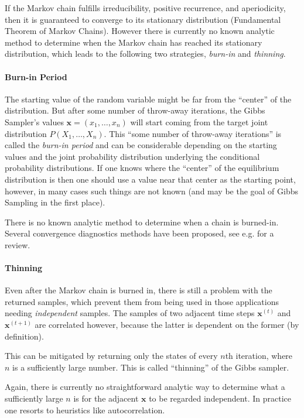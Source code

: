 If the Markov chain fulfills irreducibility, positive recurrence,
and aperiodicity, then it is guaranteed to converge to its stationary
distribution (Fundamental Theorem of Markov Chains). However there
is currently no known analytic method to determine when the Markov
chain has reached its stationary distribution, which leads to the
following two strategies, \emph{burn-in} and \emph{thinning}.

\paragraph{Burn-in Period}

The starting value of the random variable might be far from the ``center''
of the distribution. But after some number of throw-away iterations,
the Gibbs Sampler's values $\mathbf{x}=(x_{1},\dots,x_{n})$ will
start coming from the target joint distribution $P(X_{1},\dots,X_{n})$.
This ``some number of throw-away iterations'' is called the \emph{burn-in
period} and can be considerable depending on
the starting values and the joint probability distribution underlying
the conditional probability distributions. If one knows where the
``center'' of the equilibrium distribution is then one should use
a value near that center as the starting point, however, in many cases
such things are not known (and may be the goal of Gibbs Sampling in
the first place).

There is no known analytic method to determine when a chain is burned-in.
Several convergence diagnostics methods have been proposed, see e.g.
\cite{CowlesCarlin1996} for a review.

\paragraph{Thinning}

Even after the Markov chain is burned in, there is
still a problem with the returned samples, which prevent them from
being used in those applications needing \emph{independent }samples.
The samples of two adjacent time steps $\mathbf{x}^{(t)}$ and $\mathbf{x}^{(t+1)}$
are correlated however, because the latter is dependent on the former
(by definition).

This can be mitigated by returning only the states of every $n$th
iteration, where $n$ is a sufficiently large number. This is called
``thinning'' of the Gibbs sampler.

Again, there is currently no straightforward analytic way to determine
what a sufficiently large $n$ is for the adjacent $\mathbf{x}$ to
be regarded independent. In practice one resorts to heuristics like
autocorrelation.

